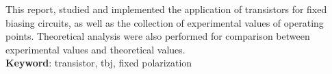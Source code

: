  \setlength{\absparsep}{18pt} %
\begin{resumo}[Abstract]
This report, studied and implemented the application of transistors for fixed biasing circuits, as well as the collection of experimental values of operating points. Theoretical analysis were also performed for comparison between experimental values and theoretical values. \\
 \noindent
 \textbf{Keyword}: transistor, tbj, fixed polarization
 \end{resumo} 